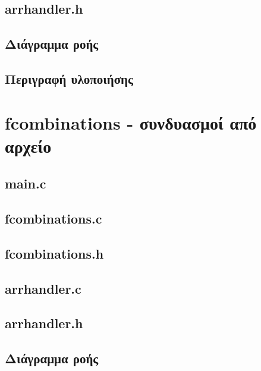 \documentclass{article}
\begin{document}
    \subsection{arrhandler.h}
         

    \subsection{Διάγραμμα ροής}

    \subsection{Περιγραφή υλοποιήσης}


\section{fcombinations - συνδυασμοί από αρχείο}

    \subsection{main.c}
        

    \subsection{fcombinations.c}
        

    \subsection{fcombinations.h}
        

    \subsection{arrhandler.c}
        

    \subsection{arrhandler.h}
         

    \subsection{Διάγραμμα ροής}
\end{document}
